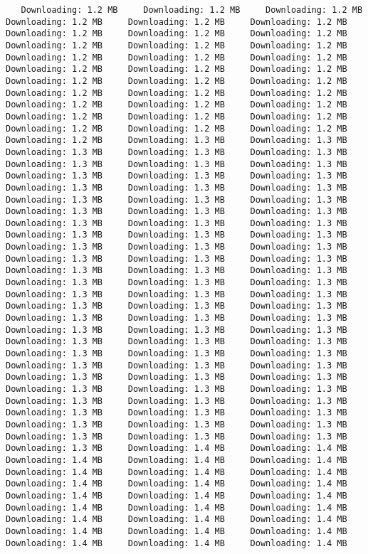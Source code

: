 \documentclass[gc, manuscript]{copernicus}
\begin{document}
\begin{verbatim}
   Downloading: 1.2 MB     Downloading: 1.2 MB     Downloading: 1.2 MB     Downloading: 1.2 MB     Downloading: 1.2 MB     Downloading: 1.2 MB     Downloading: 1.2 MB     Downloading: 1.2 MB     Downloading: 1.2 MB     Downloading: 1.2 MB     Downloading: 1.2 MB     Downloading: 1.2 MB     Downloading: 1.2 MB     Downloading: 1.2 MB     Downloading: 1.2 MB     Downloading: 1.2 MB     Downloading: 1.2 MB     Downloading: 1.2 MB     Downloading: 1.2 MB     Downloading: 1.2 MB     Downloading: 1.2 MB     Downloading: 1.2 MB     Downloading: 1.2 MB     Downloading: 1.2 MB     Downloading: 1.2 MB     Downloading: 1.2 MB     Downloading: 1.2 MB     Downloading: 1.2 MB     Downloading: 1.2 MB     Downloading: 1.2 MB     Downloading: 1.2 MB     Downloading: 1.2 MB     Downloading: 1.2 MB     Downloading: 1.2 MB     Downloading: 1.3 MB     Downloading: 1.3 MB     Downloading: 1.3 MB     Downloading: 1.3 MB     Downloading: 1.3 MB     Downloading: 1.3 MB     Downloading: 1.3 MB     Downloading: 1.3 MB     Downloading: 1.3 MB     Downloading: 1.3 MB     Downloading: 1.3 MB     Downloading: 1.3 MB     Downloading: 1.3 MB     Downloading: 1.3 MB     Downloading: 1.3 MB     Downloading: 1.3 MB     Downloading: 1.3 MB     Downloading: 1.3 MB     Downloading: 1.3 MB     Downloading: 1.3 MB     Downloading: 1.3 MB     Downloading: 1.3 MB     Downloading: 1.3 MB     Downloading: 1.3 MB     Downloading: 1.3 MB     Downloading: 1.3 MB     Downloading: 1.3 MB     Downloading: 1.3 MB     Downloading: 1.3 MB     Downloading: 1.3 MB     Downloading: 1.3 MB     Downloading: 1.3 MB     Downloading: 1.3 MB     Downloading: 1.3 MB     Downloading: 1.3 MB     Downloading: 1.3 MB     Downloading: 1.3 MB     Downloading: 1.3 MB     Downloading: 1.3 MB     Downloading: 1.3 MB     Downloading: 1.3 MB     Downloading: 1.3 MB     Downloading: 1.3 MB     Downloading: 1.3 MB     Downloading: 1.3 MB     Downloading: 1.3 MB     Downloading: 1.3 MB     Downloading: 1.3 MB     Downloading: 1.3 MB     Downloading: 1.3 MB     Downloading: 1.3 MB     Downloading: 1.3 MB     Downloading: 1.3 MB     Downloading: 1.3 MB     Downloading: 1.3 MB     Downloading: 1.3 MB     Downloading: 1.3 MB     Downloading: 1.3 MB     Downloading: 1.3 MB     Downloading: 1.3 MB     Downloading: 1.3 MB     Downloading: 1.3 MB     Downloading: 1.3 MB     Downloading: 1.3 MB     Downloading: 1.3 MB     Downloading: 1.3 MB     Downloading: 1.3 MB     Downloading: 1.3 MB     Downloading: 1.3 MB     Downloading: 1.3 MB     Downloading: 1.3 MB     Downloading: 1.3 MB     Downloading: 1.3 MB     Downloading: 1.3 MB     Downloading: 1.3 MB     Downloading: 1.3 MB     Downloading: 1.3 MB     Downloading: 1.3 MB     Downloading: 1.4 MB     Downloading: 1.4 MB     Downloading: 1.4 MB     Downloading: 1.4 MB     Downloading: 1.4 MB     Downloading: 1.4 MB     Downloading: 1.4 MB     Downloading: 1.4 MB     Downloading: 1.4 MB     Downloading: 1.4 MB     Downloading: 1.4 MB     Downloading: 1.4 MB     Downloading: 1.4 MB     Downloading: 1.4 MB     Downloading: 1.4 MB     Downloading: 1.4 MB     Downloading: 1.4 MB     Downloading: 1.4 MB     Downloading: 1.4 MB     Downloading: 1.4 MB     Downloading: 1.4 MB     Downloading: 1.4 MB     Downloading: 1.4 MB     Downloading: 1.4 MB     Downloading: 1.4 MB     Downloading: 1.4 MB     
\end{verbatim}
\end{document}
